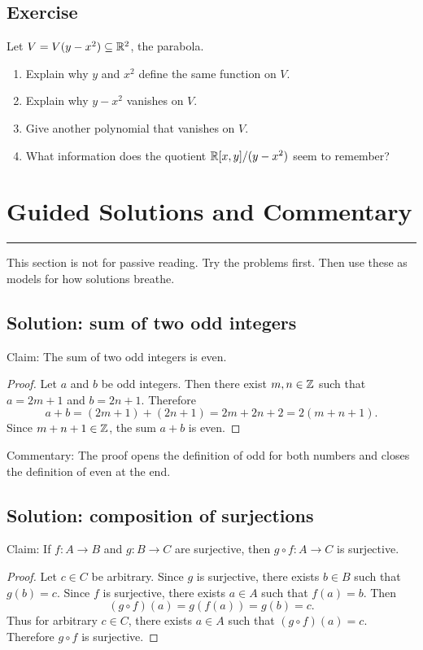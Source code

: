 \documentclass[12pt]{article}
\newcommand{\chapterline}{\vspace{0.4em}\hrule\vspace{0.8em}}
\begin{document}
\subsection{Exercise}

Let $V=V(y-x^2)\subseteq\mathbb{R}^2$, the parabola.

\begin{enumerate}
\item Explain why $y$ and $x^2$ define the same function on $V$.
\item Explain why $y-x^2$ vanishes on $V$.
\item Give another polynomial that vanishes on $V$.
\item What information does the quotient $\mathbb{R}[x,y]/(y-x^2)$ seem to remember?
\end{enumerate}

\newpage
\section{Guided Solutions and Commentary}
\chapterline

This section is not for passive reading. Try the problems first. Then use these as models for how solutions breathe.

\subsection{Solution: sum of two odd integers}

Claim: The sum of two odd integers is even.

\begin{proof}
Let $a$ and $b$ be odd integers. Then there exist $m,n\in\mathbb{Z}$ such that $a=2m+1$ and $b=2n+1$. Therefore
\[
a+b=(2m+1)+(2n+1)=2m+2n+2=2(m+n+1).
\]
Since $m+n+1\in\mathbb{Z}$, the sum $a+b$ is even.
\end{proof}

Commentary: The proof opens the definition of odd for both numbers and closes the definition of even at the end.

\subsection{Solution: composition of surjections}

Claim: If $f:A\to B$ and $g:B\to C$ are surjective, then $g\circ f:A\to C$ is surjective.

\begin{proof}
Let $c\in C$ be arbitrary. Since $g$ is surjective, there exists $b\in B$ such that $g(b)=c$. Since $f$ is surjective, there exists $a\in A$ such that $f(a)=b$. Then
\[
(g\circ f)(a)=g(f(a))=g(b)=c.
\]
Thus for arbitrary $c\in C$, there exists $a\in A$ such that $(g\circ f)(a)=c$. Therefore $g\circ f$ is surjective.
\end{proof}
\end{document}
